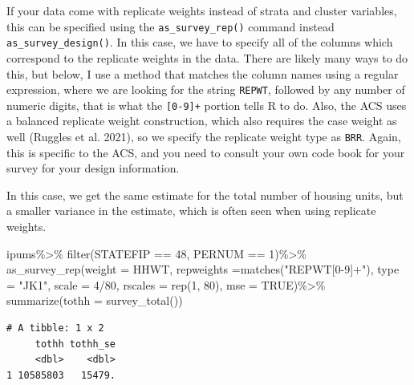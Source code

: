 \documentclass[
  letterpaper,
  DIV=11,
  numbers=noendperiod]{scrreprt}
\newenvironment{Shaded}{\begin{snugshade}}{\end{snugshade}}
\newcommand{\AttributeTok}[1]{\textcolor[rgb]{0.40,0.45,0.13}{#1}}
\newcommand{\ConstantTok}[1]{\textcolor[rgb]{0.56,0.35,0.01}{#1}}
\newcommand{\DecValTok}[1]{\textcolor[rgb]{0.68,0.00,0.00}{#1}}
\newcommand{\FunctionTok}[1]{\textcolor[rgb]{0.28,0.35,0.67}{#1}}
\newcommand{\NormalTok}[1]{\textcolor[rgb]{0.00,0.23,0.31}{#1}}
\newcommand{\SpecialCharTok}[1]{\textcolor[rgb]{0.37,0.37,0.37}{#1}}
\newcommand{\StringTok}[1]{\textcolor[rgb]{0.13,0.47,0.30}{#1}}
\begin{document}
If your data come with replicate weights instead of strata and cluster
variables, this can be specified using the \texttt{as\_survey\_rep()}
command instead \texttt{as\_survey\_design()}. In this case, we have to
specify all of the columns which correspond to the replicate weights in
the data. There are likely many ways to do this, but below, I use a
method that matches the column names using a regular expression, where
we are looking for the string \texttt{REPWT}, followed by any number of
numeric digits, that is what the \texttt{{[}0-9{]}+} portion tells R to
do. Also, the ACS uses a balanced replicate weight construction, which
also requires the case weight as well (Ruggles et al. 2021), so we
specify the replicate weight type as \texttt{BRR}. Again, this is
specific to the ACS, and you need to consult your own code book for your
survey for your design information.

In this case, we get the same estimate for the total number of housing
units, but a smaller variance in the estimate, which is often seen when
using replicate weights.

\begin{Shaded}
\begin{Highlighting}[]
\NormalTok{ipums}\SpecialCharTok{\%\textgreater{}\%}
  \FunctionTok{filter}\NormalTok{(STATEFIP }\SpecialCharTok{==} \DecValTok{48}\NormalTok{, PERNUM }\SpecialCharTok{==} \DecValTok{1}\NormalTok{)}\SpecialCharTok{\%\textgreater{}\%}
  \FunctionTok{as\_survey\_rep}\NormalTok{(}\AttributeTok{weight =}\NormalTok{ HHWT,}
            \AttributeTok{repweights =}\FunctionTok{matches}\NormalTok{(}\StringTok{"REPWT[0{-}9]+"}\NormalTok{),}
            \AttributeTok{type =} \StringTok{"JK1"}\NormalTok{,}
            \AttributeTok{scale =} \DecValTok{4}\SpecialCharTok{/}\DecValTok{80}\NormalTok{,}
            \AttributeTok{rscales =} \FunctionTok{rep}\NormalTok{(}\DecValTok{1}\NormalTok{, }\DecValTok{80}\NormalTok{),}
            \AttributeTok{mse =} \ConstantTok{TRUE}\NormalTok{)}\SpecialCharTok{\%\textgreater{}\%}
  \FunctionTok{summarize}\NormalTok{(}\AttributeTok{tothh =} \FunctionTok{survey\_total}\NormalTok{())}
\end{Highlighting}
\end{Shaded}

\begin{verbatim}
# A tibble: 1 x 2
     tothh tothh_se
     <dbl>    <dbl>
1 10585803   15479.
\end{verbatim}
\end{document}

